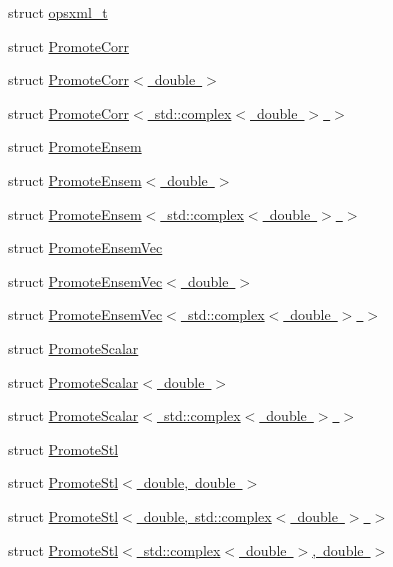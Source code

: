 \begin{DoxyCompactItemize}
\item 
struct \mbox{\hyperlink{structSEMBLE_1_1opsxml__t}{opsxml\+\_\+t}}
\item 
struct \mbox{\hyperlink{structSEMBLE_1_1PromoteCorr}{Promote\+Corr}}
\item 
struct \mbox{\hyperlink{structSEMBLE_1_1PromoteCorr_3_01double_01_4}{Promote\+Corr$<$ double $>$}}
\item 
struct \mbox{\hyperlink{structSEMBLE_1_1PromoteCorr_3_01std_1_1complex_3_01double_01_4_01_4}{Promote\+Corr$<$ std\+::complex$<$ double $>$ $>$}}
\item 
struct \mbox{\hyperlink{structSEMBLE_1_1PromoteEnsem}{Promote\+Ensem}}
\item 
struct \mbox{\hyperlink{structSEMBLE_1_1PromoteEnsem_3_01double_01_4}{Promote\+Ensem$<$ double $>$}}
\item 
struct \mbox{\hyperlink{structSEMBLE_1_1PromoteEnsem_3_01std_1_1complex_3_01double_01_4_01_4}{Promote\+Ensem$<$ std\+::complex$<$ double $>$ $>$}}
\item 
struct \mbox{\hyperlink{structSEMBLE_1_1PromoteEnsemVec}{Promote\+Ensem\+Vec}}
\item 
struct \mbox{\hyperlink{structSEMBLE_1_1PromoteEnsemVec_3_01double_01_4}{Promote\+Ensem\+Vec$<$ double $>$}}
\item 
struct \mbox{\hyperlink{structSEMBLE_1_1PromoteEnsemVec_3_01std_1_1complex_3_01double_01_4_01_4}{Promote\+Ensem\+Vec$<$ std\+::complex$<$ double $>$ $>$}}
\item 
struct \mbox{\hyperlink{structSEMBLE_1_1PromoteScalar}{Promote\+Scalar}}
\item 
struct \mbox{\hyperlink{structSEMBLE_1_1PromoteScalar_3_01double_01_4}{Promote\+Scalar$<$ double $>$}}
\item 
struct \mbox{\hyperlink{structSEMBLE_1_1PromoteScalar_3_01std_1_1complex_3_01double_01_4_01_4}{Promote\+Scalar$<$ std\+::complex$<$ double $>$ $>$}}
\item 
struct \mbox{\hyperlink{structSEMBLE_1_1PromoteStl}{Promote\+Stl}}
\item 
struct \mbox{\hyperlink{structSEMBLE_1_1PromoteStl_3_01double_00_01double_01_4}{Promote\+Stl$<$ double, double $>$}}
\item 
struct \mbox{\hyperlink{structSEMBLE_1_1PromoteStl_3_01double_00_01std_1_1complex_3_01double_01_4_01_4}{Promote\+Stl$<$ double, std\+::complex$<$ double $>$ $>$}}
\item 
struct \mbox{\hyperlink{structSEMBLE_1_1PromoteStl_3_01std_1_1complex_3_01double_01_4_00_01double_01_4}{Promote\+Stl$<$ std\+::complex$<$ double $>$, double $>$}}

\end{DoxyCompactItemize}
